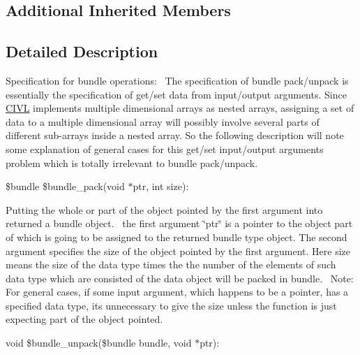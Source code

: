 \subsection*{Additional Inherited Members}


\subsection{Detailed Description}
Specification for bundle operations\+:~\newline
 The specification of bundle pack/unpack is essentially the specification of get/set data from input/output arguments. Since \hyperlink{classedu_1_1udel_1_1cis_1_1vsl_1_1civl_1_1CIVL}{C\+I\+V\+L} implements multiple dimensional arrays as nested arrays, assigning a set of data to a multiple dimensional array will possibly involve several parts of different sub-\/arrays inside a nested array. So the following description will note some explanation of general cases for this get/set input/output arguments problem which is totally irrelevant to bundle pack/unpack. 

\$bundle \$bundle\+\_\+pack(void $\ast$ptr, int size)\+:~\newline
 

Putting the whole or part of the object pointed by the first argument into returned a bundle object.~\newline
 the first argument \char`\"{}ptr\char`\"{} is a pointer to the object part of which is going to be assigned to the returned bundle type object. The second argument specifies the size of the object pointed by the first argument. Here size means the size of the data type times the the number of the elements of such data type which are consisted of the data object will be packed in bundle.~\newline
 Note\+: For general cases, if some input argument, which happens to be a pointer, has a specified data type, it\textquotesingle{}s unnecessary to give the size unless the function is just expecting part of the object pointed. 

void \$bundle\+\_\+unpack(\$bundle bundle, void $\ast$ptr)\+: 


